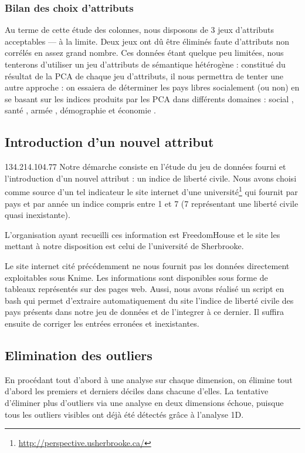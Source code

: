 \subsubsection{Bilan des choix d'attributs}
Au terme de cette étude des colonnes, nous disposons de 3 jeux d'attributs acceptables --- à la limite. Deux jeux ont dû être éliminés faute d'attributs non corrélés en assez grand nombre. Ces données étant quelque peu limitées, nous tenterons d'utiliser un jeu d'attributs de sémantique hétérogène : constitué du résultat de la PCA de chaque jeu d'attributs, il nous permettra de tenter une autre approche : on essaiera de déterminer les pays libres socialement (ou non) en se basant sur les indices produits par les PCA dans différents domaines : \og social \fg, \og santé \fg, \og armée \fg, \og démographie \fg et \og économie \fg.


\subsection{Introduction d'un nouvel attribut}
134.214.104.77
Notre démarche consiste en l'étude du jeu de données fourni et l'introduction d'un nouvel attribut : un indice de liberté civile. Nous avons choisi comme source d'un tel indicateur le site internet d'une université\footnote{\url{http://perspective.usherbrooke.ca/}} qui fournit par pays et par année un indice compris entre 1 et 7 (7 représentant une liberté civile quasi inexistante).

L'organisation ayant recueilli ces information est FreedomHouse et le site les mettant à notre disposition est celui de l'université de Sherbrooke.

Le site internet cité précédemment ne nous fournit pas les données directement exploitables sous Knime. Les informations sont disponibles sous forme de tableaux représentés sur des pages web. Aussi, nous avons réalisé un script en bash qui permet d'extraire automatiquement du site l'indice de liberté civile des pays présents dans notre jeu de données et de l'integrer à ce dernier. Il suffira ensuite de corriger les entrées erronées et inexistantes.


\subsection{Elimination des outliers}
En procédant tout d'abord à une analyse sur chaque dimension, on élimine tout d'abord les premiers et derniers déciles dans chacune d'elles.
La tentative d'éliminer plus d'outliers via une analyse en deux dimensions échoue, puisque tous les outliers visibles ont déjà été détectés grâce à l'analyse 1D.

